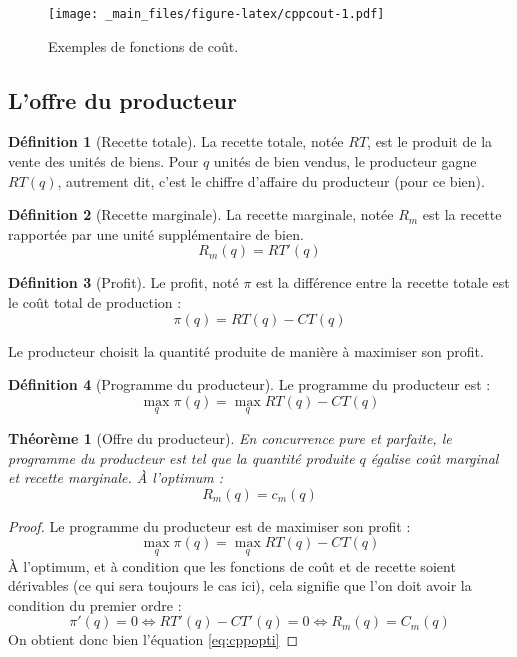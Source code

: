 \documentclass[
]{book}
\newtheorem{theorem}{Théorème}[chapter]
\theoremstyle{definition}
\newtheorem{definition}{Définition}[chapter]
\theoremstyle{definition}
\theoremstyle{definition}
\theoremstyle{definition}
\theoremstyle{remark}
\begin{document}
\begin{figure}
\centering
\texttt{[image: \_main\_files/figure-latex/cppcout-1.pdf]}
\caption{\label{fig:cppcout}Exemples de fonctions de coût.}
\end{figure}

\hypertarget{loffre-du-producteur}{%
\subsection{L'offre du producteur}\label{loffre-du-producteur}}

\begin{definition}[Recette totale]
La recette totale, notée \(RT\), est le produit de la vente des unités de biens.
Pour \(q\) unités de bien vendus, le producteur gagne \(RT(q)\), autrement dit, c'est le chiffre d'affaire du producteur (pour ce bien).
\end{definition}

\begin{definition}[Recette marginale]
La recette marginale, notée \(R_m\) est la recette rapportée par une unité supplémentaire de bien.
\[R_m(q)=RT'(q)\]
\end{definition}

\begin{definition}[Profit]
Le profit, noté \(\pi\) est la différence entre la recette totale est le coût total de production :
\[\pi(q)=RT(q)-CT(q)\]
\end{definition}

Le producteur choisit la quantité produite de manière à maximiser son profit.

\begin{definition}[Programme du producteur]
Le programme du producteur est :
\[\max_q\pi(q)=\max_q RT(q)-CT(q)\]
\end{definition}

\begin{theorem}[Offre du producteur]
En concurrence pure et parfaite, le programme du producteur est tel que la quantité produite \(q\) égalise coût marginal et recette marginale.
À l'optimum :
\begin{equation}
R_m(q) =c_m(q)
\label{eq:cppopti}
\end{equation}
\end{theorem}

\begin{proof}
Le programme du producteur est de maximiser son profit :
\[\max_q\pi(q)=\max_q RT(q)-CT(q)\]
À l'optimum, et à condition que les fonctions de coût et de recette soient dérivables (ce qui sera toujours le cas ici), cela signifie que l'on doit avoir la condition du premier ordre :
\[\pi'(q)=0\Leftrightarrow RT'(q)-CT'(q)=0\Leftrightarrow R_m(q)=C_m(q)\]
On obtient donc bien l'équation \eqref{eq:cppopti}
\end{proof}
\end{document}
